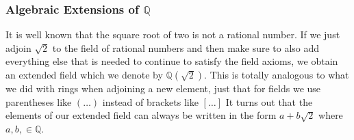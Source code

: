 

\subsubsection{Algebraic Extensions of $\mathbb{Q}$}
It is well known that the square root of two is not a rational number. If we just adjoin $\sqrt{2}$ to the field of rational numbers and then make sure to also add everything else that is needed to continue to satisfy the field axioms, we obtain an extended field which we denote by $\mathbb{Q}(\sqrt{2})$. This is totally analogous to what we did with rings when adjoining a new element, just that for fields we use parentheses like $(\ldots)$ instead of brackets like $[\ldots]$ It turns out that the elements of our extended field can always be written in the form $a + b \sqrt{2}$ where $a,b, \in \mathbb{Q}$.


